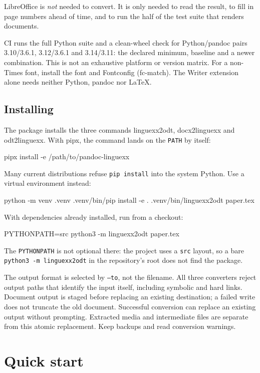 \documentclass[11pt,a4paper]{article}
\newcommand{\opt}[1]{\texttt{#1}}
\newcommand{\prog}[1]{\textsf{#1}}
\begin{document}
LibreOffice is \emph{not} needed to convert. It is only needed to read the
result, to fill in page numbers ahead of time, and to run the half of the test
suite that renders documents.

CI runs the full Python suite and a clean-wheel check for Python/pandoc
pairs 3.10/3.6.1, 3.12/3.6.1 and 3.14/3.11: the declared minimum, baseline
and a newer combination. This is not an exhaustive platform or version matrix. For a
non-Times font, install the font and Fontconfig (\prog{fc-match}). The
Writer extension alone needs neither Python, pandoc nor \LaTeX{}.

\subsection{Installing}

The package installs the three commands \prog{linguexx2odt},
\prog{docx2linguexx} and \prog{odt2linguexx}. With \prog{pipx}, the
command lands on the \texttt{PATH} by itself:
\begin{code}
pipx install -e /path/to/pandoc-linguexx
\end{code}
Many current distributions refuse \texttt{pip install} into the system Python.
Use a virtual environment instead:
\begin{code}
python -m venv .venv
.venv/bin/pip install -e .
.venv/bin/linguexx2odt paper.tex
\end{code}
With dependencies already installed, run from a checkout:
\begin{code}
PYTHONPATH=src python3 -m linguexx2odt paper.tex
\end{code}
The \texttt{PYTHONPATH} is not optional there: the project uses a \texttt{src}
layout, so a bare \texttt{python3 -m linguexx2odt} in the repository's root
does not find the package.

The output format is selected by \opt{--to}, not the filename. All three
converters reject output paths that identify the input itself, including
symbolic and hard links. Document output is staged before replacing an
existing destination; a failed write does not truncate the old document.
Successful conversion can replace an existing output without prompting.
Extracted media and intermediate files are separate from this atomic
replacement. Keep backups and read conversion warnings.

\section{Quick start}\label{sec:quick}
\end{document}
